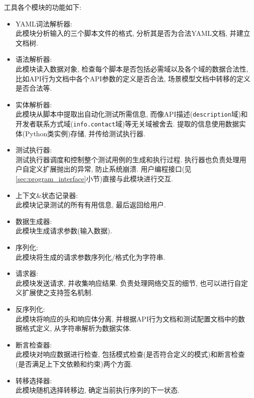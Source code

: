 	    工具各个模块的功能如下:
	    \begin{itemize}
	        \item YAML词法解析器:\\
	            此模块分析输入的三个脚本文件的格式, 分析其是否为合法YAML文档, 并建立文档树.
	        \item 语法解析器:\\
	            此模块读入数据对象, 检查每个脚本是否包括必需域以及各个域的数据合法性, 比如API行为文档中各个API参数的定义是否合法, 场景模型文档中转移的定义是否合法等.
	        \item 实体解析器:\\
	            此模块从脚本中提取出自动化测试所需信息, 而像API描述(\texttt{description}域)和开发者联系方式域(\texttt{info.contact}域)等无关域被舍去. 提取的信息使用数据实体(Python类实例)存储, 并传给测试执行器.
	        \item 测试执行器:\\
	            测试执行器调度和控制整个测试用例的生成和执行过程. 执行器也负责处理用户自定义扩展抛出的异常, 防止系统崩溃. 用户编程接口(见\ref{sec:program_interface}小节)直接与此模块进行交互.
	        \item 上下文\&状态记录器:\\
	            此模块记录测试的所有有用信息, 最后返回给用户.
	        \item 数据生成器:\\
	            此模块生成请求参数(输入数据).
	        \item 序列化:\\
	            此模块将生成的请求参数序列化/格式化为字符串.
	        \item 请求器:\\
	            此模块发送请求, 并收集响应结果. 负责处理网络交互的细节, 也可以进行自定义扩展使之支持签名机制.
	        \item 反序列化:\\
	            此模块将响应的头和响应体分离, 并根据API行为文档和测试配置文档中的数据格式定义, 从字符串解析为数据实体.
	        \item 断言检查器:\\
	            此模块对响应数据进行检查, 包括模式检查(是否符合定义的模式)和断言检查(是否满足上下文依赖和约束)两个方面.
	        \item 转移选择器:\\
	            此模块随机选择转移边, 确定当前执行序列的下一状态.
	    \end{itemize}

